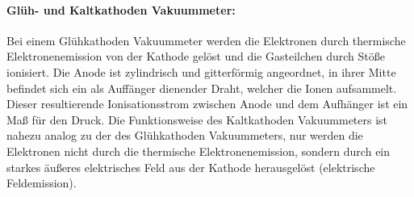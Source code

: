 \paragraph{Glüh- und Kaltkathoden Vakuummeter:}
Bei einem Glühkathoden Vakuummeter werden die Elektronen durch
thermische Elektronenemission von der Kathode gelöst und die Gasteilchen durch Stöße ionisiert.
Die Anode ist zylindrisch und gitterförmig angeordnet,
in ihrer Mitte befindet sich ein als Auffänger dienender Draht,
welcher die Ionen aufsammelt.
Dieser resultierende Ionisationsstrom zwischen Anode und dem Aufhänger ist ein Maß für den Druck.
Die Funktionsweise des Kaltkathoden Vakuummeters ist nahezu analog zu der des Glühkathoden Vakuummeters,
nur werden die Elektronen nicht durch die thermische Elektronenemission,
sondern durch ein starkes äußeres elektrisches Feld aus der Kathode herausgelöst
(elektrische Feldemission).
